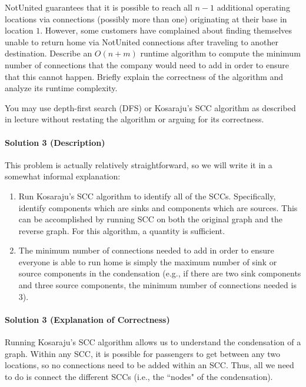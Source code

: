 \documentclass[11pt]{article}
\begin{document}
NotUnited guarantees that it is possible to reach all $n-1$ additional operating locations via connections (possibly more than one) originating at their base in location $1$. However, some customers have complained about finding themselves unable to return home via NotUnited connections after traveling to another destination. Describe an $O(n+m)$ runtime algorithm to compute the minimum number of connections that the company would need to add in order to ensure that this cannot happen. Briefly explain the correctness of the algorithm and analyze its runtime complexity.

You may use depth-first search (DFS) or Kosaraju's SCC algorithm as described in lecture without restating the algorithm or arguing for its correctness.

\paragraph{Solution 3 (Description)}

This problem is actually relatively straightforward, so we will write it in a somewhat informal explanation:

\begin{enumerate}
    \item Run Kosaraju's SCC algorithm to identify all of the SCCs. Specifically, identify components which are sinks and components which are sources. This can be accomplished by running SCC on both the original graph and the reverse graph. For this algorithm, a quantity is sufficient.
    \item The minimum number of connections needed to add in order to ensure everyone is able to run home is simply the maximum number of sink or source components in the condensation (e.g., if there are two sink components and three source components, the minimum number of connections needed is 3).
\end{enumerate}

\paragraph{Solution 3 (Explanation of Correctness)}

Running Kosaraju's SCC algorithm allows us to understand the condensation of a graph. Within any SCC, it is possible for passengers to get between any two locations, so no connections need to be added within an SCC. Thus, all we need to do is connect the different SCCs (i.e., the ``nodes" of the condensation).
\vspace{0.5em}
\end{document}
